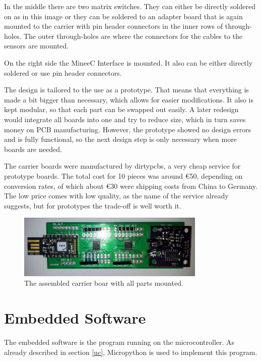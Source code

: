 In the middle there are two matrix switches. They can either be directly soldered on as in this image or they can be soldered to an adapter board that is again mounted to the carrier with pin header connectors in the inner rows of through-holes.  The outer through-holes are where the connectors for the cables to the sensors are mounted.

On the right side the MineeC Interface is mounted. It also can be either directly soldered or use pin header connectors.

The design is tailored to the use as a prototype. That means that everything is made a bit bigger than necessary, which allows for easier modifications. It also is kept modular, so that each part can be swapped out easily. A later redesign would integrate all boards into one and try to reduce size, which in turn saves money on PCB manufacturing. However, the prototype showed no design errors and is fully functional, so the next design step is only necessary when more boards are needed.

The carrier boards were manufactured by dirtypcbs, a very cheap service for prototype boards. The total cost for 10 pieces was around \euro{50}, depending on conversion rates, of which about \euro{30} were shipping costs from China to Germany. The low price comes with low quality, as the name of the service already suggests, but for prototypes the trade-off is well worth it.

\begin{figure}
	\begin{center}
		\includegraphics[width=0.8\textwidth]{images/cb.jpg} 
		\caption{The assembled carrier boar with all parts mounted.}
		\label{fig:cb}
	\end{center}
\end{figure}

\section{Embedded Software}

The embedded software is the program running on the microcontroller. As already described in section \ref{uc}, Micropython is used to implement this program.\\

